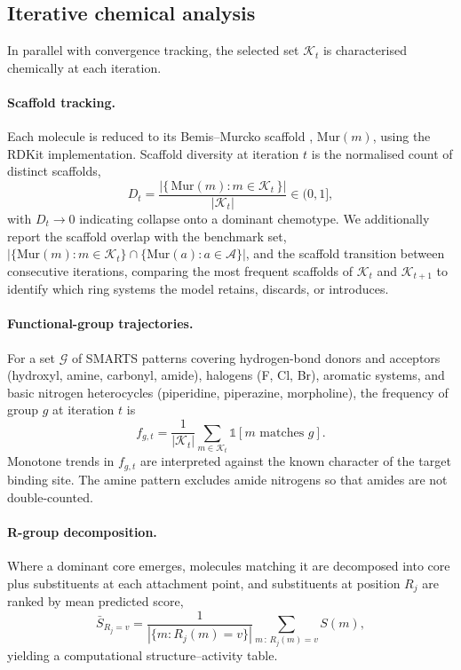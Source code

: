 \documentclass[11pt]{article}
\newcommand{\Actives}{\mathcal{A}}              %
\newcommand{\TopK}{\mathcal{K}}                 %
\newcommand{\Murcko}{\mathrm{Mur}}
\newcommand{\indic}{\mathbb{1}}
\begin{document}
\subsection{Iterative chemical analysis}
\label{sec:methods:chem}

In parallel with convergence tracking, the selected set $\TopK_t$ is
characterised chemically at each iteration.

\paragraph{Scaffold tracking.}
Each molecule is reduced to its Bemis--Murcko scaffold \citep{bemis1996},
$\Murcko(m)$, using the RDKit implementation. Scaffold diversity at iteration
$t$ is the normalised count of distinct scaffolds,
\begin{equation}
  D_t = \frac{\left|\{\, \Murcko(m) : m \in \TopK_t \,\}\right|}{|\TopK_t|}
  \in (0, 1],
  \label{eq:scaffolddiv}
\end{equation}
with $D_t \to 0$ indicating collapse onto a dominant chemotype. We additionally
report the scaffold overlap with the benchmark set,
$\left|\{\Murcko(m) : m \in \TopK_t\} \cap \{\Murcko(a) : a \in \Actives\}\right|$,
and the scaffold transition between consecutive iterations, comparing the most
frequent scaffolds of $\TopK_t$ and $\TopK_{t+1}$ to identify which ring systems
the model retains, discards, or introduces.

\paragraph{Functional-group trajectories.}
For a set $\mathcal{G}$ of SMARTS patterns covering hydrogen-bond donors and
acceptors (hydroxyl, amine, carbonyl, amide), halogens (F, Cl, Br), aromatic
systems, and basic nitrogen heterocycles (piperidine, piperazine, morpholine),
the frequency of group $g$ at iteration $t$ is
\begin{equation}
  f_{g,t}
  = \frac{1}{|\TopK_t|}
    \sum_{m \in \TopK_t} \indic\!\left[m \text{ matches } g\right].
  \label{eq:fg}
\end{equation}
Monotone trends in $f_{g,t}$ are interpreted against the known character of the
target binding site. The amine pattern excludes amide nitrogens so that amides
are not double-counted.

\paragraph{R-group decomposition.}
Where a dominant core emerges, molecules matching it are decomposed into core
plus substituents at each attachment point, and substituents at position $R_j$
are ranked by mean predicted score,
\begin{equation}
  \bar{S}_{R_j = v}
  = \frac{1}{|\{m : R_j(m) = v\}|}
    \sum_{m\,:\,R_j(m) = v} S(m),
  \label{eq:sar}
\end{equation}
yielding a computational structure--activity table.
\end{document}
